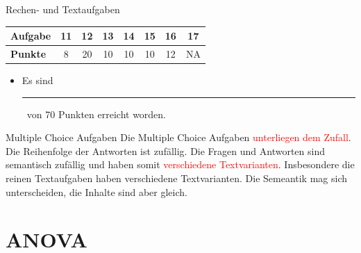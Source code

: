 \documentclass[a4paper, 9pt]{scrartcl}\usepackage[]{graphicx}\usepackage[]{xcolor}
\begin{document}
\begin{graybox}{Rechen- und Textaufgaben}
  \begin{center}
    \large
    \begin{tabular}{|l|c|c|c|c|c|c|c|}
      \hline
      \textbf{Aufgabe} & \textbf{11} & \textbf{12} & \textbf{13} & \textbf{14} & \textbf{15} & \textbf{16} & \textbf{17} \strut\\
      \hline
      \textbf{Punkte} & 
      \hspace{1Ex}\Large\textcolor{gray!70}{8}\hspace{1Ex}  & 
      \hspace{1Ex}\Large\textcolor{gray!70}{20}\hspace{1Ex}  & 
      \hspace{1Ex}\Large\textcolor{gray!70}{10}\hspace{1Ex}  & 
      \hspace{1Ex}\Large\textcolor{gray!70}{10}\hspace{1Ex}  & 
      \hspace{1Ex}\Large\textcolor{gray!70}{10}\hspace{1Ex}  & 
      \hspace{1Ex}\Large\textcolor{gray!70}{12}\hspace{1Ex}  & 
      \hspace{1Ex}\Large\textcolor{gray!70}{NA}\hspace{1Ex} \strut\\
      \hline
  \end{tabular}
\end{center}
\begin{itemize}
\item Es sind \rule[0ex]{2em}{.4pt}\, von 70 Punkten erreicht worden.
\end{itemize}
\end{graybox}

\clearpage
\begin{graybox}{Multiple Choice Aufgaben}
Die Multiple Choice Aufgaben \textcolor{red}{unterliegen dem Zufall}. Die Reihenfolge der Antworten ist zufällig. Die Fragen und Antworten sind semantisch zufällig und haben somit \textcolor{red}{verschiedene Textvarianten}. Insbesondere die reinen Textaufgaben haben verschiedene Textvarianten. Die Semeantik mag sich unterscheiden, die Inhalte sind aber gleich.
\end{graybox}
\section*{ANOVA}
\end{document}
